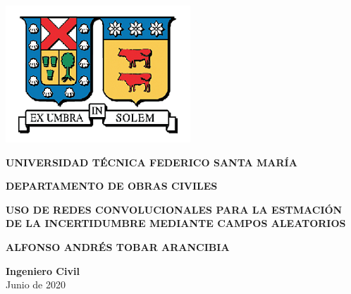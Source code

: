 \documentclass[10pt,twoside,letterpaper]{phstylee}
\begin{document}
%

\pagestyle{empty}

\begin{center}

\begin{center}
  \includegraphics{images/logo_new.png}
\end{center}


\large \textbf{UNIVERSIDAD TÉCNICA FEDERICO SANTA MARÍA}

\large \textbf{DEPARTAMENTO DE OBRAS CIVILES}

\vspace{40mm}

\Large {\bf USO DE REDES CONVOLUCIONALES PARA LA ESTMACIÓN DE LA INCERTIDUMBRE MEDIANTE CAMPOS ALEATORIOS}

\vspace{40mm}

\large \textbf{ALFONSO ANDRÉS TOBAR ARANCIBIA}

\vspace{5mm}

\textbf{Ingeniero Civil}\\




\vspace{5mm}
Junio de 2020


\end{center}



\pagestyle{empty}
\end{document}
